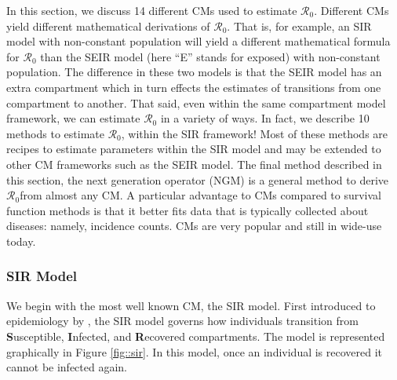 \documentclass[12pt]{article}
\newcommand{\rr}{\ensuremath{\mathcal{R}_0}}
\begin{document}
In this section, we discuss 14 different CMs used to estimate $\rr$.  Different CMs yield different mathematical derivations of \rr.  That is, for example, an SIR model with non-constant population will yield a different mathematical formula for $\rr$ than the SEIR model (here ``E'' stands for exposed) with non-constant population.  The difference in these two models is that the SEIR model has an extra compartment which in turn effects the estimates of transitions from one compartment to another.  That said, even within the same compartment model framework, we can estimate $\rr$ in a variety of ways.  In fact, we describe 10 methods to estimate $\rr$, within the SIR framework!  Most of these methods are recipes to estimate parameters within the SIR model and may be extended to other CM frameworks such as the SEIR model.  The final method described in this section, the next generation operator (NGM) is a general method to derive \rr from almost any CM.  A particular advantage to CMs compared to survival function methods is that it better fits data that is typically collected about diseases: namely, incidence counts.  CMs are very popular and still in wide-use today.




\subsubsection{SIR Model}
\label{sec:sir-model}

We begin with the most well known CM, the SIR model.   First introduced to epidemiology by  \cite{Kermack700}, the SIR model governs how individuals transition from \textbf{S}usceptible, \textbf{I}nfected, and \textbf{R}ecovered compartments.  The model is represented graphically in Figure \ref{fig::sir}.  In this model, once an individual is recovered it cannot be infected again.
\end{document}
